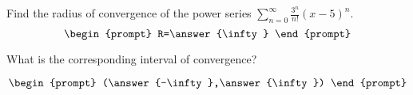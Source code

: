 \documentclass{ximera}
\author{Gregory Hartman \and Matthew Carr}
\begin{document}
\begin{exercise}




Find the radius of convergence of the power series $\sum_{n=0}^{\infty}\frac{3^n}{n!}(x-5)^n$.
\[
\begin{prompt}
R=\answer{\infty}
\end{prompt}
\]

What is the corresponding interval of convergence?

\[
\begin{prompt}
(\answer{-\infty},\answer{\infty})
\end{prompt}
\]

\end{exercise}
\end{document}
